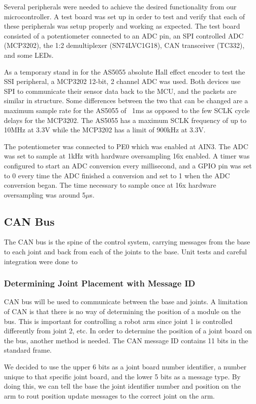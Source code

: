 \noindent Several peripherals were needed to achieve the desired functionality from our microcontroller. A test board was set up in order to test and verify that each of these peripherals was setup properly and working as expected. The test board consisted of a potentiometer connected to an ADC pin, an SPI controlled ADC (MCP3202), the 1:2 demultiplexer (SN74LVC1G18), CAN transceiver (TC332), and some LEDs.

\noindent As a temporary stand in for the AS5055 absolute Hall effect encoder to test the SSI peripheral, a MCP3202 12-bit, 2 channel ADC was used. Both devices use SPI to communicate their sensor data back to the MCU, and the packets are similar in structure. Some differences between the two that can be changed are a maximum sample rate for the AS5055 of ~1ms as opposed to the few SCLK cycle delays for the MCP3202. The AS5055 has a maximum SCLK frequency of up to 10MHz at 3.3V while the MCP3202 has a limit of 900kHz at 3.3V. 

\noindent The potentiometer was connected to PE0 which was enabled at AIN3. The ADC was set to sample at 1kHz with hardware oversampling 16x enabled. A timer was configured to start an ADC conversion every millisecond, and a GPIO pin was set to 0 every time the ADC finished a conversion and set to 1 when the ADC conversion began. The time necessary to sample once at 16x hardware oversampling was around 5$\mu$s.

\subsection{CAN Bus}
The CAN bus is the spine of the control system, carrying messages from the base to each joint and back from each of the joints to the base. Unit tests and careful integration were done to 

\subsubsection{Determining Joint Placement with Message ID}
CAN bus will be used to communicate between the base and joints. A limitation of CAN is that there is no way of determining the position of a module on the bus. This is important for controlling a robot arm since joint 1 is controlled differently from joint 2, etc. In order to determine the position of a joint board on the bus, another method is needed. The CAN message ID contains 11 bits in the standard frame.

\noindent We decided to use the upper 6 bits as a joint board number identifier, a number unique to that specific joint board, and the lower 5 bits as a message type. By doing this, we can tell the base the joint identifier number and position on the arm to rout position update messages to the correct joint on the arm.

